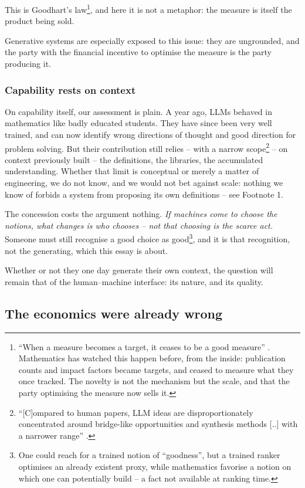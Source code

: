 \documentclass[11pt, a4paper,twosided]{amsart}
\newcommand{\key}[1]{\emph{#1}}
\begin{document}
   This is Goodhart's law\footnote{``When a measure becomes a target, it ceases to be a good measure'' \cite{goodhart1975}. Mathematics has watched this happen before, from the inside: publication counts and impact factors became targets, and ceased to measure what they once tracked. The novelty is not the mechanism but the scale, and that the party optimising the measure now sells it.}, and here it is not a metaphor: the measure is itself the product being sold.

   Generative systems are especially exposed to this issue: they are ungrounded, and the party with the financial incentive to optimise the measure is the party producing it.


\subsubsection{Capability rests on context}

On capability itself, our assessment is plain. A year ago, LLMs behaved in mathematics like badly educated students. They have since been very well trained, and can now identify wrong directions of thought and good direction for problem solving. But their contribution still relies -- with a narrow scope\footnote{``[C]ompared to human papers, LLM ideas are disproportionately concentrated around bridge-like opportunities and synthesis methods [..] with a narrower range'' \cite{CZC26}.} -- on context previously built -- the definitions, the libraries, the accumulated understanding. Whether that limit is conceptual or merely a matter of engineering, we do not know, and we would not bet against scale: nothing we know of forbids a system from proposing its own definitions -- see Footnote 1. 

The concession costs the argument nothing. \key{If machines come to choose the notions, what changes is who chooses -- not that choosing is the scarce act.} Someone must still recognise a good choice as good\footnote{One could reach for a trained notion of ``goodness'', but a trained ranker optimises an already existent proxy, while mathematics favorise a notion on which one can potentially build -- a fact not available at ranking time.}, and it is that recognition, not the generating, which this essay is about.

Whether or not they one day generate their own context, the question will remain that of the human--machine interface: its nature, and its quality.

\subsection{The economics were already wrong}\label{sec:economics}
\end{document}
